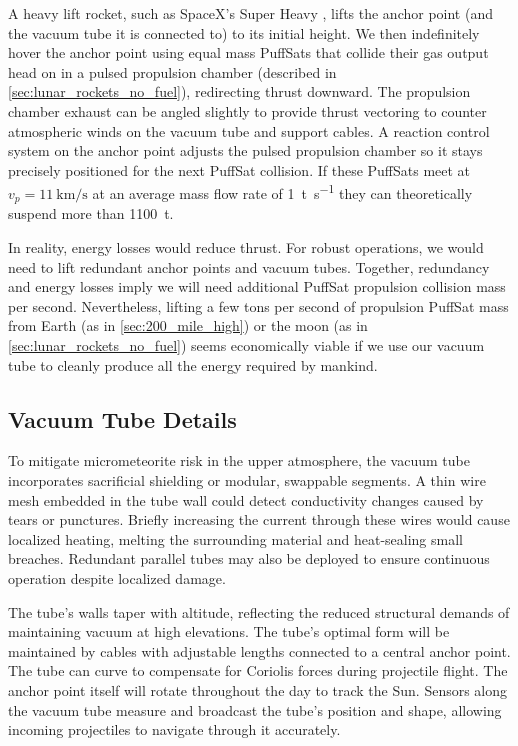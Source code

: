 \documentclass{article}
\begin{document}
A heavy lift rocket, such as SpaceX's Super Heavy \cite{spacex_super_heavy}, lifts the anchor point (and the vacuum tube it is connected to) to its initial height.  We then indefinitely hover the anchor point using equal mass PuffSats that collide their gas output head on in a pulsed propulsion chamber (described in \autoref{sec:lunar_rockets_no_fuel}), redirecting thrust downward. The propulsion chamber exhaust can be angled slightly to provide thrust vectoring to counter atmospheric winds on the vacuum tube and support cables.  A reaction control system on the anchor point adjusts the pulsed propulsion chamber so it stays precisely positioned for the next PuffSat collision.  If these PuffSats meet at $v_p=\SI{11}{\kilo\meter\per\second}$ at an average mass flow rate of \SI{1}{\tonne\per\second} they can theoretically suspend more than \SI{1100}{\tonne}.   

In reality, energy losses would reduce thrust.   For robust operations, we would need to lift redundant anchor points and vacuum tubes.  Together, redundancy and energy losses imply we will need additional PuffSat propulsion collision mass per second.  Nevertheless, lifting a few tons per second of propulsion PuffSat mass from Earth (as in \autoref{sec:200_mile_high}) or the moon (as in \autoref{sec:lunar_rockets_no_fuel}) seems economically viable if we use our vacuum tube to cleanly produce all the energy required by mankind. 

\subsection{Vacuum Tube Details}
To mitigate micrometeorite risk in the upper atmosphere, the vacuum tube incorporates sacrificial shielding or modular, swappable segments. A thin wire mesh embedded in the tube wall could detect conductivity changes caused by tears or punctures. Briefly increasing the current through these wires would cause localized heating, melting the surrounding material and heat-sealing small breaches. Redundant parallel tubes may also be deployed to ensure continuous operation despite localized damage. 

The tube’s walls taper with altitude, reflecting the reduced structural demands of maintaining vacuum at high elevations.  The tube's optimal form will be maintained by cables with adjustable lengths connected to a central anchor point. The tube can curve to compensate for Coriolis forces during projectile flight. The anchor point itself will rotate throughout the day to track the Sun.  Sensors along the vacuum tube measure and broadcast the tube's position and shape, allowing incoming projectiles to navigate through it accurately.
\end{document}
